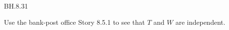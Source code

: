 
\setcounter{theorem}{30}
\begin{exercise} BH.8.31
\begin{hint}
Use the bank-post office Story 8.5.1 to see that $T$ and $W$ are independent.
\end{hint}
\end{exercise}

